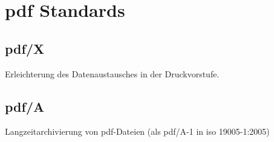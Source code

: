 \section{\gls{pdf} Standards}

\subsection{\gls{pdf}/X}
Erleichterung des Datenaustausches in der Druckvorstufe.

\subsection{\gls{pdf}/A}
Langzeitarchivierung von \gls{pdf}-Dateien (als \gls{pdf}/A-1 in \gls{iso} 19005-1:2005) 

